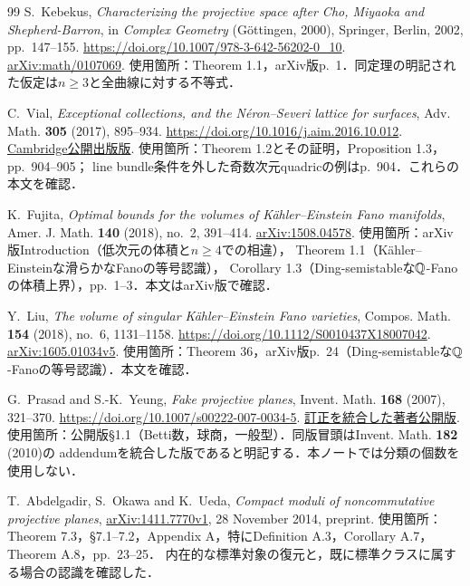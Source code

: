\documentclass[11pt,a4paper]{ltjsarticle}
\begin{document}
\begin{thebibliography}{99}
 S.~Kebekus,
\emph{Characterizing the projective space after Cho, Miyaoka and Shepherd-Barron},
in \emph{Complex Geometry} (G\"ottingen, 2000), Springer, Berlin, 2002, pp.~147--155.
\url{https://doi.org/10.1007/978-3-642-56202-0_10}.
\href{https://arxiv.org/abs/math/0107069}{arXiv:math/0107069}.
使用箇所：Theorem 1.1，arXiv版p.~1．同定理の明記された仮定は$n\geq3$と全曲線に対する不等式．

 C.~Vial,
\emph{Exceptional collections, and the N\'eron--Severi lattice for surfaces},
Adv. Math. \textbf{305} (2017), 895--934.
\url{https://doi.org/10.1016/j.aim.2016.10.012}.
\href{https://www.repository.cam.ac.uk/bitstream/1810/261567/1/Vial-2016-Advances_in_Mathematics-VoR.pdf}
{Cambridge公開出版版}.
使用箇所：Theorem 1.2とその証明，Proposition 1.3，pp.~904--905；
line bundle条件を外した奇数次元quadricの例はp.~904．これらの本文を確認．

 K.~Fujita,
\emph{Optimal bounds for the volumes of K\"ahler--Einstein Fano manifolds},
Amer. J. Math. \textbf{140} (2018), no.~2, 391--414.
\href{https://arxiv.org/abs/1508.04578}{arXiv:1508.04578}.
使用箇所：arXiv版Introduction（低次元の体積と$n\geq4$での相違），
Theorem 1.1（K\"ahler--Einsteinな滑らかなFanoの等号認識），
Corollary 1.3（Ding-semistableな$\mathbb Q$-Fanoの体積上界），pp.~1--3．本文はarXiv版で確認．

 Y.~Liu,
\emph{The volume of singular K\"ahler--Einstein Fano varieties},
Compos. Math. \textbf{154} (2018), no.~6, 1131--1158.
\url{https://doi.org/10.1112/S0010437X18007042}.
\href{https://arxiv.org/abs/1605.01034v5}{arXiv:1605.01034v5}.
使用箇所：Theorem 36，arXiv版p.~24（Ding-semistableな$\mathbb Q$-Fanoの等号認識）．本文を確認．

 G.~Prasad and S.-K.~Yeung,
\emph{Fake projective planes}, Invent. Math. \textbf{168} (2007), 321--370.
\url{https://doi.org/10.1007/s00222-007-0034-5}.
\href{https://www.math.purdue.edu/~yeungs/papers/fpp.pdf}{訂正を統合した著者公開版}.
使用箇所：公開版\S1.1（Betti数，球商，一般型）．同版冒頭はInvent. Math. \textbf{182} (2010)の
addendumを統合した版であると明記する．本ノートでは分類の個数を使用しない．


 T.~Abdelgadir, S.~Okawa and K.~Ueda,
\emph{Compact moduli of noncommutative projective planes},
\href{https://arxiv.org/abs/1411.7770v1}{arXiv:1411.7770v1}, 28 November 2014, preprint.
使用箇所：Theorem 7.3，\S7.1--7.2，Appendix A，特にDefinition A.3，Corollary A.7，Theorem A.8，pp.~23--25．
内在的な標準対象の復元と，既に標準クラスに属する場合の認識を確認した．


\end{thebibliography}
\end{document}
